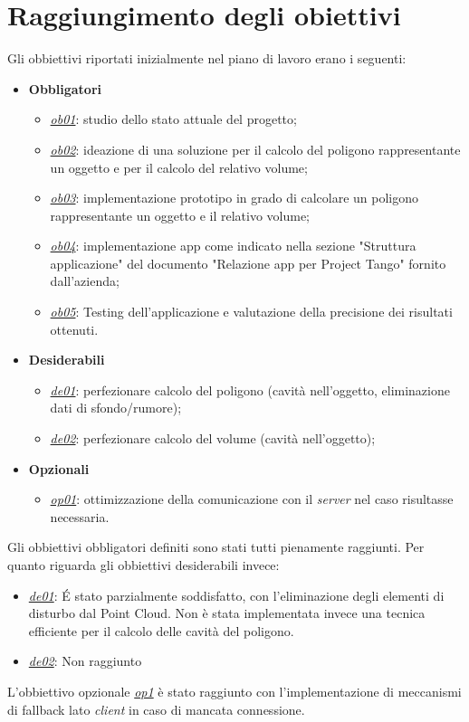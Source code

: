 \newpage
\section{Raggiungimento degli obiettivi}
Gli obbiettivi riportati inizialmente nel piano di lavoro erano i seguenti:
\begin{itemize}
	\item \textbf{Obbligatori}
	\begin{itemize}
		\item \underline{\textit{ob01}}: studio dello stato attuale del progetto;
		\item \underline{\textit{ob02}}: ideazione di una soluzione per il calcolo del poligono rappresentante un oggetto e per il calcolo del relativo volume;
		\item \underline{\textit{ob03}}: implementazione prototipo in grado di calcolare un poligono rappresentante un oggetto e il relativo volume;
		\item \underline{\textit{ob04}}: implementazione app come indicato nella sezione "Struttura applicazione" del documento "Relazione app per Project Tango" fornito dall’azienda;
		\item \underline{\textit{ob05}}: Testing dell’applicazione e valutazione della precisione dei risultati ottenuti.
	\end{itemize}
	
	\item \textbf{Desiderabili}
	\begin{itemize}
		\item \underline{\textit{de01}}: perfezionare calcolo del poligono (cavità nell’oggetto, eliminazione dati di sfondo/rumore);
		\item \underline{\textit{de02}}: perfezionare calcolo del volume (cavità nell’oggetto);
	\end{itemize}
	
	\item \textbf{Opzionali}
	\begin{itemize}
		\item \underline{\textit{op01}}: ottimizzazione della comunicazione con il \emph{server} nel caso risultasse necessaria.
	\end{itemize} 
\end{itemize}
\noindent 
Gli obbiettivi obbligatori definiti sono stati tutti pienamente raggiunti.
Per quanto riguarda gli obbiettivi desiderabili invece:
\begin{itemize}
	\item \underline{\textit{de01}}: \'E stato parzialmente soddisfatto, con l'eliminazione degli elementi di disturbo dal Point Cloud. Non è stata implementata invece una tecnica efficiente per il calcolo delle cavità del poligono.
	\item \underline{\textit{de02}}: Non raggiunto
\end{itemize}
\noindent
L'obbiettivo opzionale \underline{\textit{op1}} è stato raggiunto con l'implementazione di meccanismi di fallback lato \emph{client} in caso di mancata connessione.

